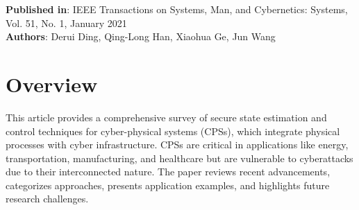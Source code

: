 \documentclass{article}
\begin{document}


\maketitle

\textbf{Published in}: IEEE Transactions on Systems, Man, and Cybernetics: Systems, Vol. 51, No. 1, January 2021 \\
\textbf{Authors}: Derui Ding, Qing-Long Han, Xiaohua Ge, Jun Wang

\section*{Overview}
This article provides a comprehensive survey of secure state estimation and control techniques for cyber-physical systems (CPSs), which integrate physical processes with cyber infrastructure. CPSs are critical in applications like energy, transportation, manufacturing, and healthcare but are vulnerable to cyberattacks due to their interconnected nature. The paper reviews recent advancements, categorizes approaches, presents application examples, and highlights future research challenges.
\end{document}
